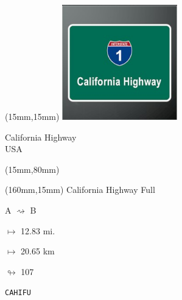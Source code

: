 \begin{textblock*}{50mm}(15mm,15mm)%
\includegraphics[width=50mm]{LG/2015-05-20_00077.png}
\par California Highway\\ USA
\end{textblock*}
\begin{textblock*}{185mm}(15mm,80mm)%
\end{textblock*}
\begin{textblock*}{40mm}(160mm,15mm)%
California Highway Full
\par A $\rightsquigarrow$ B
\Large
\par$\mapsto$ 12.83 mi.
\par$\mapsto$ 20.65 km
\par$\looparrowright$ 107
\par\hfill\tiny\tt CAHIFU\\
\end{textblock*}
\null\newpage

